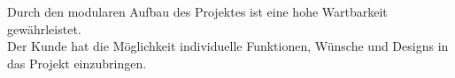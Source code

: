 Durch den modularen Aufbau des Projektes ist eine hohe Wartbarkeit gewährleistet.\\
Der Kunde hat die Möglichkeit individuelle Funktionen, Wünsche und Designs in das Projekt einzubringen.\\